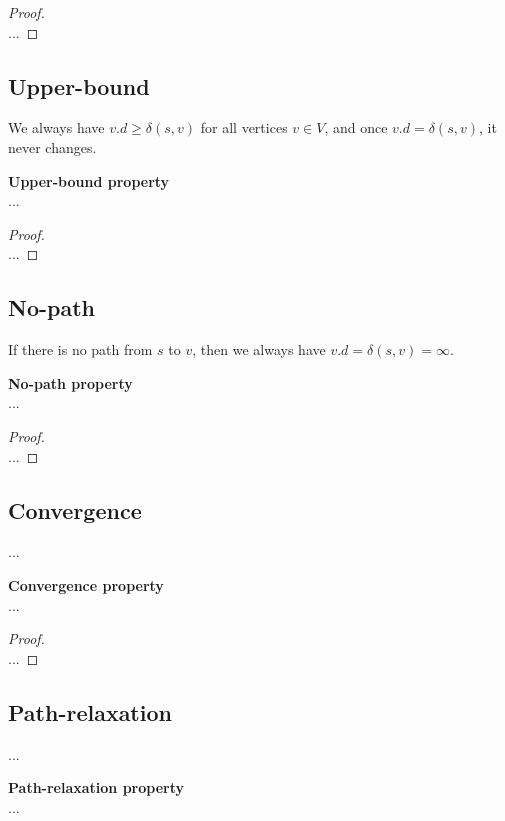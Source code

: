 \begin{proof} \textnormal{\cite[p.~671, thm. 24.10]{clrs}} \\
	...
\end{proof}

\subsection{Upper-bound}
We always have $v.d \geq \delta(s, v)$ for all vertices $v \in V$, and once
$v.d = \delta(s, v)$, it never changes.
\begin{lemma}
	\textbf{Upper-bound property} \\
	...
\end{lemma}

\begin{proof} \textnormal{\cite[p.~671-672, thm. 24.11]{clrs}} \\
	...
\end{proof}

\subsection{No-path}
If there is no path from $s$ to $v$, then we always have $v.d = \delta(s, v) =
\infty$.
\begin{corollary}
	\textbf{No-path property} \\
	...
\end{corollary}

\begin{proof} \textnormal{\cite[p.~672, thm. 24.12]{clrs}} \\
	...
\end{proof}

\subsection{Convergence}
...
\begin{lemma}
	\textbf{Convergence property} \\
	...
\end{lemma}

\begin{proof} \textnormal{\cite[p.~672-673, thm. 24.14]{clrs}} \\
	...
\end{proof}

\subsection{Path-relaxation}
...
\begin{lemma}
	\textbf{Path-relaxation property} \\
	...
\end{lemma}

